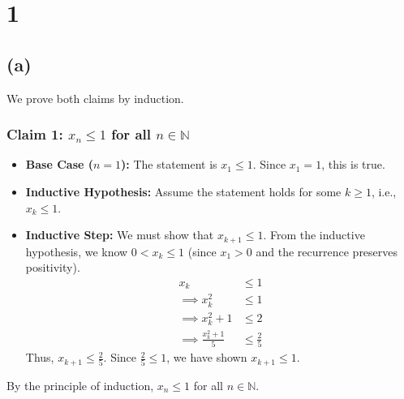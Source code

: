 \documentclass[12pt,a4paper]{article}
\theoremstyle{definition}
\theoremstyle{remark}
\begin{document}
\section*{1}
\subsection*{(a)}

We prove both claims by induction.

\subsubsection*{Claim 1: $x_n \le 1$ for all $n \in \mathbb{N}$}
\begin{itemize}
    \item \textbf{Base Case ($n=1$):}
    The statement is $x_1 \le 1$. Since $x_1 = 1$, this is true.

    \item \textbf{Inductive Hypothesis:}
    Assume the statement holds for some $k \ge 1$, i.e., $x_k \le 1$.

    \item \textbf{Inductive Step:}
    We must show that $x_{k+1} \le 1$. From the inductive hypothesis, we know $0 < x_k \le 1$ (since $x_1>0$ and the recurrence preserves positivity).
    \begin{align*}
        x_k &\le 1 \\
        \implies x_k^2 &\le 1 \\
        \implies x_k^2 + 1 &\le 2 \\
        \implies \frac{x_k^2 + 1}{5} &\le \frac{2}{5}
    \end{align*}
    Thus, $x_{k+1} \le \frac{2}{5}$. Since $\frac{2}{5} \le 1$, we have shown $x_{k+1} \le 1$.
\end{itemize}
By the principle of induction, $x_n \le 1$ for all $n \in \mathbb{N}$.
\end{document}
